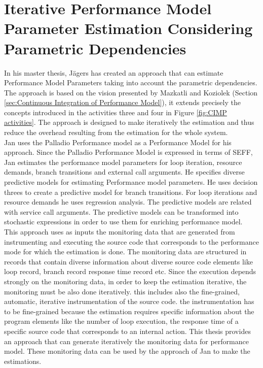 \section{Iterative Performance Model Parameter Estimation Considering Parametric Dependencies}
\label{sec:Iterative Performance Model Parameter Estimation Considering Parametric Dependencies}
In his master thesis, Jägers has created an approach that can estimate Performance Model Parameters taking into account the parametric dependencies. The approach is based on the vision presented by Mazkatli and Koziolek (Section \ref{sec:Continuous Integration of Performance Model}), it extends precisely the concepts introduced in the activities three and four in Figure \ref{fig:CIMP activities}. The approach is designed to make iteratively the estimation and thus reduce the overhead resulting from the estimation for the whole system. \\

Jan uses the Palladio Performance model as a Performance Model for his approach. Since the Palladio Performance Model is expressed in terms of SEFF, Jan estimates the performance model parameters for loop iteration, resource demands, branch transitions and external call arguments. He specifies diverse predictive models for estimating Performance model parameters. He uses decision threes to create a predictive model for branch transitions. For loop iterations and resource demands he uses regression analysis. The predictive models are related with service call arguments. The predictive models can be transformed into stochastic expressions in order to use them for enriching performance model.\\

This approach uses as inputs the monitoring data that are generated from instrumenting and executing the source code that corresponds to the performance mode for which the estimation is done. The monitoring data are structured in records that contain diverse information about diverse source code elements like loop record, branch record response time record etc. Since the execution depends strongly on the monitoring data, in order to keep the estimation iterative, the monitoring must be also done iteratively. this includes also the fine-grained, automatic, iterative instrumentation of the source code. the instrumentation has to be fine-grained because the estimation requires specific information about the program elements like the number of loop execution, the response time of a specific source code that corresponds to an internal action. This thesis provides an approach that can generate iteratively the monitoring data for performance model. These monitoring data can be used by the approach of Jan to make the estimations.\\

